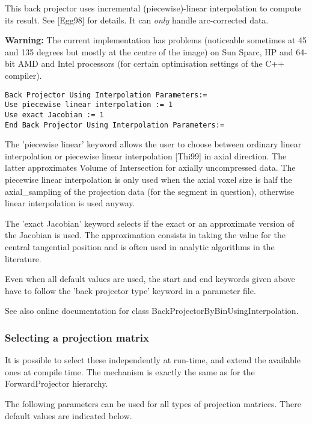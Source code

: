 \documentclass{article}
\begin{document}
{ 
}

This back projector uses incremental (piecewise)-linear interpolation 
to compute its result. See [Egg98] for details. It can \textit{only} handle arc-corrected data.


\textbf{Warning:} The current implementation has problems (noticeable 
sometimes at 45 and 135 degrees but mostly at the centre of the image) on Sun 
Sparc, HP and 64-bit AMD and Intel processors (for certain optimisation settings
of the C++ compiler).

{ 
}
\begin{verbatim}
Back Projector Using Interpolation Parameters:=
Use piecewise linear interpolation := 1
Use exact Jacobian := 1
End Back Projector Using Interpolation Parameters:=
\end{verbatim}

The 'piecewise linear' keyword allows the user to choose between 
ordinary linear interpolation or piecewise linear interpolation 
[Thi99] in axial direction. The latter approximates Volume of 
Intersection for axially uncompressed data. The piecewise linear 
interpolation is only used when the axial voxel size is half 
the axial\_sampling of the projection data (for the segment in 
question), otherwise linear interpolation is used anyway.


The 'exact Jacobian' keyword selects if the exact or an approximate 
version of the Jacobian is used. The approximation consists in 
taking the value for the central tangential position and is often 
used in analytic algorithms in the literature.


Even when all default values are used, the start and end keywords 
given above have to follow the 'back projector type' keyword 
in a parameter file.


See also online documentation for class BackProjectorByBinUsingInterpolation.



\subsubsection{
Selecting a projection matrix}
\label{sec:projmatrix}
It is possible to select these independently at run-time, and 
extend the available ones at compile time. The mechanism is exactly 
the same as for the ForwardProjector hierarchy.

{ 
}
\label{sec:projmatrixcommon}
The following parameters can be used for all types of projection 
matrices. There default values are indicated below.
\end{document}
